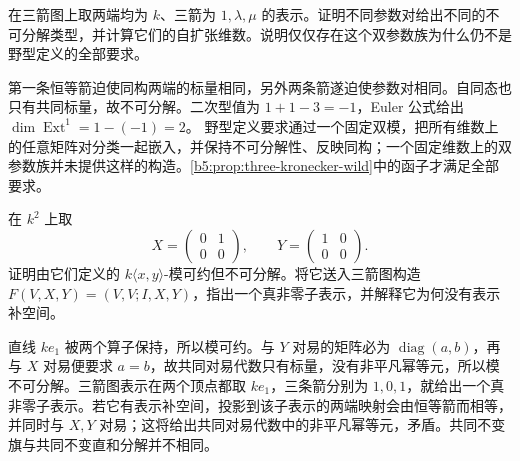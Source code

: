 \begin{optionalexercise}\label{b5:ex:10-three-arrows-parameters}
	在三箭图上取两端均为 \(k\)、三箭为 \(1,\lambda,\mu\) 的表示。证明不同参数对给出不同的不可分解类型，并计算它们的自扩张维数。说明仅仅存在这个双参数族为什么仍不是野型定义的全部要求。
\end{optionalexercise}
\begin{solution}
	第一条恒等箭迫使同构两端的标量相同，另外两条箭遂迫使参数对相同。自同态也只有共同标量，故不可分解。二次型值为 \(1+1-3=-1\)，Euler 公式给出 \(\dim\operatorname{Ext}^1=1-(-1)=2\)。 野型定义要求通过一个固定双模，把所有维数上的任意矩阵对分类一起嵌入，并保持不可分解性、反映同构；一个固定维数上的双参数族并未提供这样的构造。\cref{b5:prop:three-kronecker-wild}中的函子才满足全部要求。
\end{solution}

\begin{optionalexercise}\label{b5:ex:10-free-pair-decomposition}
	在 \(k^2\) 上取
	\[
		X=\begin{pmatrix}0&1\\0&0\end{pmatrix},\qquad
		Y=\begin{pmatrix}1&0\\0&0\end{pmatrix}.
	\]
	证明由它们定义的 \(k\langle x,y\rangle\)-模可约但不可分解。将它送入三箭图构造 \(F(V,X,Y)=(V,V;I,X,Y)\)，指出一个真非零子表示，并解释它为何没有表示补空间。
\end{optionalexercise}
\begin{solution}
	直线 \(ke_1\) 被两个算子保持，所以模可约。与 \(Y\) 对易的矩阵必为 \(\operatorname{diag}(a,b)\)，再与 \(X\) 对易便要求 \(a=b\)，故共同对易代数只有标量，没有非平凡幂等元，所以模不可分解。三箭图表示在两个顶点都取 \(ke_1\)，三条箭分别为 \(1,0,1\)，就给出一个真非零子表示。若它有表示补空间，投影到该子表示的两端映射会由恒等箭而相等，并同时与 \(X,Y\) 对易；这将给出共同对易代数中的非平凡幂等元，矛盾。共同不变旗与共同不变直和分解并不相同。
\end{solution}


